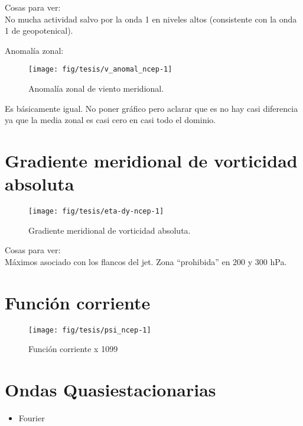 \documentclass[spanish,a4paper]{book}
\providecommand{\tightlist}{%
  \setlength{\itemsep}{0pt}\setlength{\parskip}{0pt}}
\begin{document}
Cosas para ver:\\
No mucha actividad salvo por la onda 1 en niveles altos (consistente con
la onda 1 de geopotenical).

Anomalía zonal:

\begin{figure}

{\centering \texttt{[image: fig/tesis/v\_anomal\_ncep-1]} 

}

\caption{Anomalía zonal de viento meridional.}\label{fig:v_anomal_ncep}
\end{figure}

Es básicamente igual. No poner gráfico pero aclarar que es no hay casi
diferencia ya que la media zonal es casi cero en casi todo el dominio.

\section{Gradiente meridional de vorticidad
absoluta}\label{gradiente-meridional-de-vorticidad-absoluta}

\begin{figure}

{\centering \texttt{[image: fig/tesis/eta-dy-ncep-1]} 

}

\caption{Gradiente meridional de vorticidad absoluta.}\label{fig:eta-dy-ncep}
\end{figure}

Cosas para ver:\\
Máximos asociado con los flancos del jet. Zona ``prohibida'' en 200 y
300 hPa.

\section{Función corriente}\label{funcion-corriente}

\begin{figure*}
\texttt{[image: fig/tesis/psi\_ncep-1]} \caption{Función corriente x 1099}\label{fig:psi_ncep}
\end{figure*}

\section{Ondas Quasiestacionarias}\label{ondas-quasiestacionarias}

\begin{itemize}
\tightlist
\item
  Fourier
\end{itemize}
\end{document}
